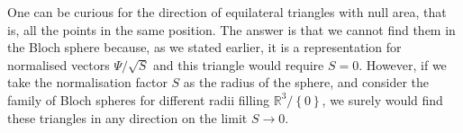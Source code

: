 One can be curious for the direction of equilateral triangles with null area, that is, all the points in the same position.  The answer is that we cannot find them in the Bloch sphere because, as we stated earlier, it is a representation for normalised vectors $\Psi/\sqrt{S}$ and this triangle would require $S=0$. However, if we take the normalisation factor $S$ as the radius of the sphere, and consider the family of Bloch spheres for different radii filling $\mathbb{R}^3/\left\{0\right\}$, we surely would find these triangles in any direction on the limit $S\to 0$.\\







